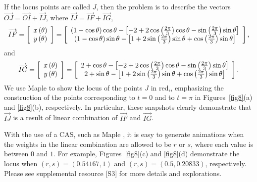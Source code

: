 \documentclass[12pt,a4paper]{article}%
\begin{document}
If the locus points are called $J$, then the problem is to describe the 
vectors $\overrightarrow{OJ}=\overrightarrow{OI}+\overrightarrow{IJ}$,
where $\overrightarrow{IJ}=\overrightarrow{IF}+\overrightarrow{IG}$,
\[
\overrightarrow{IF}=\left[
\begin{array}
[c]{c}%
x\left(  \theta\right) \\
y\left(  \theta\right)
\end{array}
\right]  =\left[
\begin{array}
[c]{c}%
\left(  1-\cos\theta\right)  \cos\theta-\left[  -2+2\cos\left(  \frac{2\pi}%
{3}\right)  \cos\theta-\sin\left(  \frac{2\pi}{3}\right)  \sin\theta\right] \\
\left(  1-\cos\theta\right)  \sin\theta-\left[  1+2\sin\left(  \frac{2\pi}%
{3}\right)  \sin\theta+\cos\left(  \frac{2\pi}{3}\right)  \sin\theta\right]
\end{array}
\right],
\]
and
\[
\overrightarrow{IG}=\left[
\begin{array}
[c]{c}%
x\left(  \theta\right) \\
y\left(  \theta\right)
\end{array}
\right]  =\left[
\begin{array}
[c]{c}%
2+\cos\theta-\left[  -2+2\cos\left(  \frac{2\pi}{3}\right)  \cos\theta
-\sin\left(  \frac{2\pi}{3}\right)  \sin\theta\right] \\
2+\sin\theta-\left[  1+2\sin\left(  \frac{2\pi}{3}\right)  \sin\theta
+\cos\left(  \frac{2\pi}{3}\right)  \sin\theta\right]
\end{array}
\right]  .
\]
We use Maple \cite{Maple} to show the locus of the points $J$ in red,, emphasizing
the construction of the points corresponding to $t=0$ and to $t=\pi$ in
Figures~\ref{fig8}(a) and \ref{fig8}(b), respectively.
In particular, these snapshots clearly demonstrate that $\overrightarrow{IJ}$ is a result
of linear combination of $\overrightarrow{IF}$ and $\overrightarrow{IG}$.

With the use of a CAS, such as Maple \cite{Maple}, it is easy to generate
animations when the weights in the linear combination are allowed to be $r$ or $s$,
where each value is between $0$ and $1$.
For example, Figures~\ref{fig8}(c) and \ref{fig8}(d) demonstrate the locus when
$( r, s )  = ( 0.54167, 1 )$ and $( r, s )=( 0.5, 0.20833 )$, respectively.
Please see supplemental resource [S3] for more details and explorations.
\end{document}
